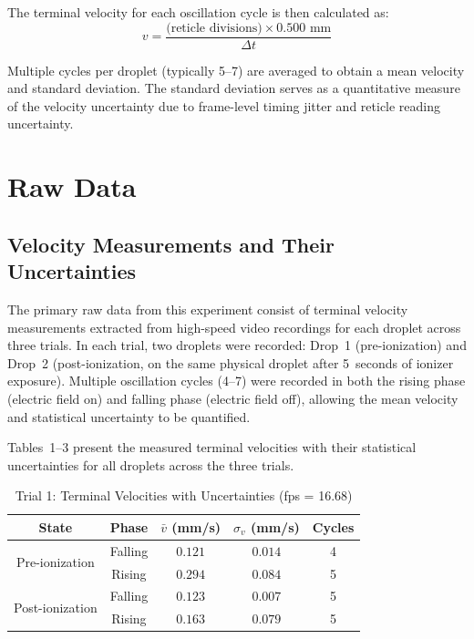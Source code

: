 \documentclass[11pt]{article}
\begin{document}
The terminal velocity for each oscillation cycle is then calculated as:
\begin{equation}
v = \frac{\text{(reticle divisions)} \times 0.500 \text{ mm}}{\Delta t}
\end{equation}

Multiple cycles per droplet (typically 5--7) are averaged to obtain a mean velocity and standard deviation. The standard deviation serves as a quantitative measure of the velocity uncertainty due to frame-level timing jitter and reticle reading uncertainty.

\section{Raw Data}

\subsection{Velocity Measurements and Their Uncertainties}

The primary raw data from this experiment consist of terminal velocity measurements extracted from high-speed video recordings for each droplet across three trials. In each trial, two droplets were recorded: Drop~1 (pre-ionization) and Drop~2 (post-ionization, on the same physical droplet after 5~seconds of ionizer exposure). Multiple oscillation cycles (4--7) were recorded in both the rising phase (electric field on) and falling phase (electric field off), allowing the mean velocity and statistical uncertainty to be quantified.

Tables~1--3 present the measured terminal velocities with their statistical uncertainties for all droplets across the three trials.

\begin{table}[h!]
    \centering
    \caption{Trial 1: Terminal Velocities with Uncertainties (fps = 16.68)}
    \vspace{0.1in}
    \begin{tabular}{|c|c|c|c|c|}
    \hline
    \textbf{State} & \textbf{Phase} & \textbf{$\bar{v}$ (mm/s)} & $\sigma_v$ (mm/s) & \textbf{Cycles} \\
    \hline
    \multirow{2}{*}{Pre-ionization} & Falling & $0.121$ & $0.014$ & 4 \\
    & Rising & $0.294$ & $0.084$ & 5 \\
    \hline
    \multirow{2}{*}{Post-ionization} & Falling & $0.123$ & $0.007$ & 5 \\
    & Rising & $0.163$ & $0.079$ & 5 \\
    \hline
    \end{tabular}
\end{table}
\end{document}
